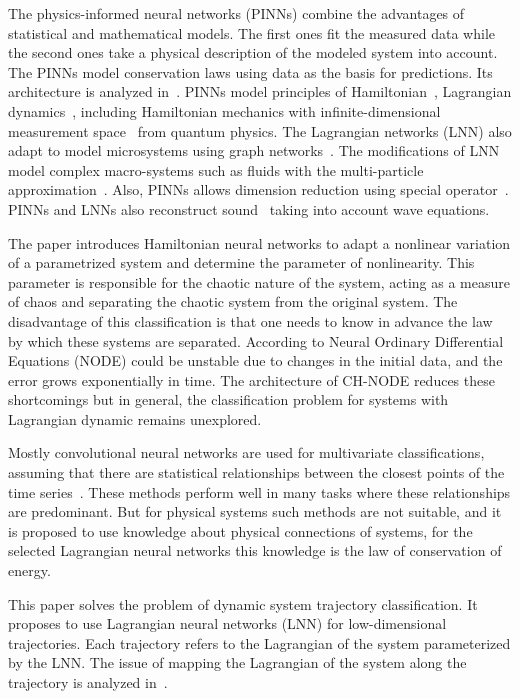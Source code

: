 \documentclass[sn-mathphys-num]{sn-jnl}
\theoremstyle{thmstylethree}
\theoremstyle{thmstyletwo}
\theoremstyle{thmstyleone}
\begin{document}
The physics-informed neural networks (PINNs) combine the advantages of statistical and mathematical models. The first ones fit the measured data while the second ones take a physical description of the modeled system into account. The PINNs model conservation laws using data as the basis for predictions. Its architecture is analyzed in~\cite{PINNreview}. PINNs model principles of Hamiltonian~\cite{HNN}, Lagrangian dynamics~\cite{article}, including Hamiltonian mechanics with infinite-dimensional measurement space~\cite{quantumHNN} from
quantum physics. The Lagrangian networks (LNN) also adapt to model microsystems using graph networks~\cite{LGNN}. The modifications of LNN model complex macro-systems such as fluids with the multi-particle approximation~\cite{fluid-LNN}. Also, PINNs allows dimension reduction using special operator~\cite{HNNreduce}. PINNs and LNNs also reconstruct sound~\cite{PINNsoundwave} taking into account wave equations. 

The paper \cite{HNNadapt} introduces Hamiltonian neural networks to adapt a nonlinear variation of a parametrized system and determine the parameter of nonlinearity. This parameter is responsible for the chaotic nature of the system, acting as a measure of chaos and separating the chaotic system from the original system. The disadvantage of this classification is that one needs to know in advance the law by which these systems are separated. According to \cite{HNNrobustclass} Neural Ordinary Differential Equations (NODE) could be unstable due to changes in the initial data, and the error grows exponentially in time. The architecture of CH-NODE reduces these shortcomings but in general, the classification problem for systems with Lagrangian dynamic remains unexplored.

Mostly convolutional neural networks are used for multivariate classifications, assuming that there are statistical relationships between the closest points of the time series~\cite{TCSreview}. These methods perform well in many tasks where these relationships are predominant. But for physical systems such methods are not suitable, and it is proposed to use knowledge about physical connections of systems, for the selected Lagrangian neural networks this knowledge is the law of conservation of energy.	

This paper solves the problem of dynamic system trajectory classification. It proposes to use Lagrangian neural networks (LNN) for low-dimensional trajectories. Each trajectory refers to the Lagrangian of the system parameterized by the LNN. The issue of mapping the Lagrangian of the system along the trajectory is analyzed in~\cite{article}.
\end{document}
